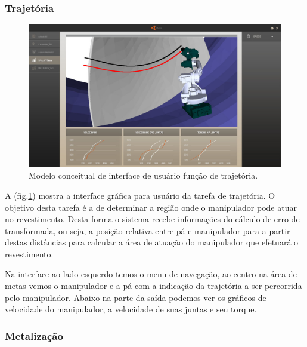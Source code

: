 \documentclass[12pt,a4paper]{article}
\begin{document}
\subsubsection {Trajetória}

\begin{figure}[H]
\begin{center}
  \includegraphics[width=\columnwidth]{figs/Trajetoria.jpg}
  \caption{Modelo conceitual de interface de usuário função de trajetória.}
  \label{fig:Interface_trajetoria}
\end{center}
\end{figure} 

A (fig.\ref{fig:Interface_trajetoria}) mostra a interface gráfica para usuário
da tarefa de trajetória. O objetivo desta tarefa é a de determinar a região onde
o manipulador pode atuar no revestimento. Desta forma o sistema recebe
informações do cálculo de erro de transformada, ou seja, a posição relativa
entre pá e manipulador para a partir destas distâncias para calcular a área de
atuação do manipulador que efetuará o revestimento.

Na interface ao lado esquerdo temos o menu de navegação, ao centro na área de
metas vemos o manipulador e a pá com a indicação da trajetória a ser percorrida
pelo manipulador. Abaixo na parte da saída podemos ver os gráficos de
velocidade do manipulador, a velocidade de suas juntas e seu torque. 

\subsubsection {Metalização}
\end{document}
